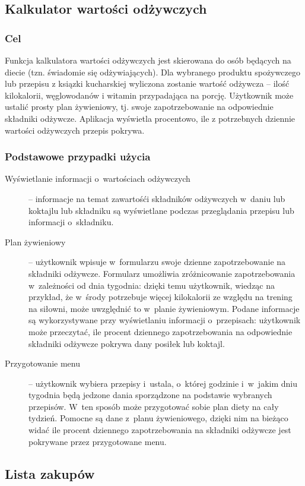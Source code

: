 \documentclass[12pt,leqno, twoside]{mwart}
\begin{document}
\subsection{Kalkulator wartości odżywczych}
\subsubsection{Cel}
Funkcja kalkulatora wartości odżywczych jest skierowana do osób będących na diecie (tzn. świadomie się odżywiających). Dla wybranego produktu spożywczego lub przepisu z ksiązki kucharskiej wyliczona zostanie wartość odżywcza -- ilość kilokalorii, węglowodanów i witamin przypadająca na porcję. Użytkownik może ustalić prosty plan żywieniowy, tj. swoje zapotrzebowanie na odpowiednie składniki odżywcze. Aplikacja wyświetla procentowo, ile z potrzebnych dziennie wartości odżywczych przepis pokrywa.
\subsubsection{Podstawowe przypadki użycia}
\begin{description}
  \item[Wyświetlanie informacji o~wartościach odżywczych] -- informacje na temat zawartośći składników odżywczych w~daniu lub koktajlu lub składniku są wyświetlane podczas przeglądania przepisu lub informacji o~składniku.
  \item[Plan żywieniowy] -- użytkownik wpisuje w~formularzu swoje dzienne zapotrzebowanie na składniki odżywcze. Formularz umożliwia zróżnicowanie zapotrzebowania w~zależności od dnia tygodnia: dzięki temu użytkownik, wiedząc na przykład, że w~środy potrzebuje więcej kilokalorii ze względu na trening na siłowni, może uwzględnić to w~planie żywieniowym. Podane informacje są wykorzystywane przy wyświetlaniu informacji o~przepisach: użytkownik może przeczytać, ile procent dziennego zapotrzebowania na odpowiednie składniki odżywcze pokrywa dany posiłek lub koktajl.
  \item[Przygotowanie menu] -- użytkownik wybiera przepisy i~ustala, o~której godzinie i~w~jakim dniu tygodnia będą jedzone dania sporządzone na podstawie wybranych przepisów. W~ten sposób może przygotować sobie plan diety na cały tydzień. Pomocne są dane z~planu żywieniowego, dzięki nim na bieżąco widać ile procent dziennego zapotrzebowania na składniki odżywcze jest pokrywane przez przygotowane menu.
\end{description}
\subsection{Lista zakupów}
\end{document}
